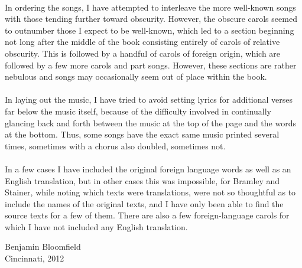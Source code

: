 \documentclass[letterpaper,12pt]{book} %
\begin{document}
\\
\vfill
In ordering the songs, I have attempted to interleave the more well-known songs with those tending further toward obscurity.  However, the obscure carols seemed to outnumber those I expect to be well-known, which led to a section beginning not long after the middle of the book consisting entirely of carols of relative obscurity.  This is followed by a handful of carols of foreign origin, which are followed by a few more carols and part songs.  However, these sections are rather nebulous and songs may occasionally seem out of place within the book.\\
\\
\vfill
In laying out the music, I have tried to avoid setting lyrics for additional verses far below the music itself, because of the difficulty involved in continually glancing back and forth between the music at the top of the page and the words at the bottom.  Thus, some songs have the exact same music printed several times, sometimes with a chorus also doubled, sometimes not.\\
\\
\vfill
In a few cases I have included the original foreign language words as well as an English translation, but in other cases this was impossible, for Bramley and Stainer, while noting which texts were translations, were not so thoughtful as to include the names of the original texts, and I have only been able to find the source texts for a few of them.  There are also a few foreign-language carols for which I have not included any English translation.\\
\vfill

\begin{flushright}
Benjamin Bloomfield\\
Cincinnati, 2012
\end{flushright}
\newpage
{}
\begin{multicols}{2}
\tableofcontents
\end{multicols}
\newpage
\end{document}
